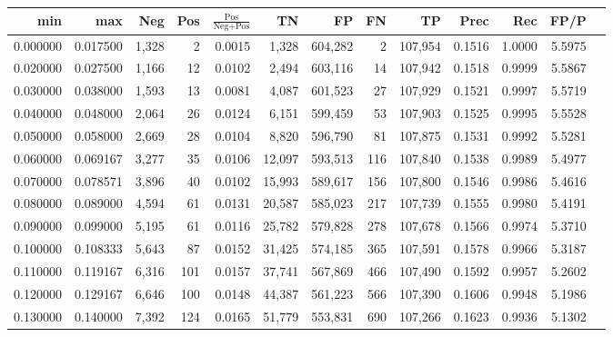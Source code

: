 \begin{tabular}{rrrrrrrrrrrrr}
\toprule
     min &      max &    Neg &   Pos & $\frac{\text{Pos}}{\text{Neg}+\text{Pos}}$ &      TN &      FP &      FN &      TP &   Prec &    Rec &   FP/P \\
\midrule
0.000000 & 0.017500 &  1,328 &     2 &                                     0.0015 &   1,328 & 604,282 &       2 & 107,954 & 0.1516 & 1.0000 & 5.5975 \\
0.020000 & 0.027500 &  1,166 &    12 &                                     0.0102 &   2,494 & 603,116 &      14 & 107,942 & 0.1518 & 0.9999 & 5.5867 \\
0.030000 & 0.038000 &  1,593 &    13 &                                     0.0081 &   4,087 & 601,523 &      27 & 107,929 & 0.1521 & 0.9997 & 5.5719 \\
0.040000 & 0.048000 &  2,064 &    26 &                                     0.0124 &   6,151 & 599,459 &      53 & 107,903 & 0.1525 & 0.9995 & 5.5528 \\
0.050000 & 0.058000 &  2,669 &    28 &                                     0.0104 &   8,820 & 596,790 &      81 & 107,875 & 0.1531 & 0.9992 & 5.5281 \\
0.060000 & 0.069167 &  3,277 &    35 &                                     0.0106 &  12,097 & 593,513 &     116 & 107,840 & 0.1538 & 0.9989 & 5.4977 \\
0.070000 & 0.078571 &  3,896 &    40 &                                     0.0102 &  15,993 & 589,617 &     156 & 107,800 & 0.1546 & 0.9986 & 5.4616 \\
0.080000 & 0.089000 &  4,594 &    61 &                                     0.0131 &  20,587 & 585,023 &     217 & 107,739 & 0.1555 & 0.9980 & 5.4191 \\
0.090000 & 0.099000 &  5,195 &    61 &                                     0.0116 &  25,782 & 579,828 &     278 & 107,678 & 0.1566 & 0.9974 & 5.3710 \\
0.100000 & 0.108333 &  5,643 &    87 &                                     0.0152 &  31,425 & 574,185 &     365 & 107,591 & 0.1578 & 0.9966 & 5.3187 \\
0.110000 & 0.119167 &  6,316 &   101 &                                     0.0157 &  37,741 & 567,869 &     466 & 107,490 & 0.1592 & 0.9957 & 5.2602 \\
0.120000 & 0.129167 &  6,646 &   100 &                                     0.0148 &  44,387 & 561,223 &     566 & 107,390 & 0.1606 & 0.9948 & 5.1986 \\
0.130000 & 0.140000 &  7,392 &   124 &                                     0.0165 &  51,779 & 553,831 &     690 & 107,266 & 0.1623 & 0.9936 & 5.1302 \\

\end{tabular}
